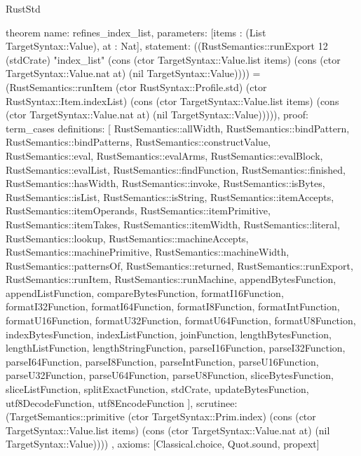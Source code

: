 \begin{lexlean}{RustStd}
\begin{semanticmodule}
theorem{
  name: refines_index_list,
  parameters: [items : (List TargetSyntax::Value), at : Nat],
  statement: ((RustSemantics::runExport 12 (stdCrate) "index_list" (cons (ctor TargetSyntax::Value.list items) (cons (ctor TargetSyntax::Value.nat at) (nil TargetSyntax::Value)))) = (RustSemantics::runItem (ctor RustSyntax::Profile.std) (ctor RustSyntax::Item.indexList) (cons (ctor TargetSyntax::Value.list items) (cons (ctor TargetSyntax::Value.nat at) (nil TargetSyntax::Value))))),
  proof: term_cases{
    definitions: [
      RustSemantics::allWidth,
      RustSemantics::bindPattern,
      RustSemantics::bindPatterns,
      RustSemantics::constructValue,
      RustSemantics::eval,
      RustSemantics::evalArms,
      RustSemantics::evalBlock,
      RustSemantics::evalList,
      RustSemantics::findFunction,
      RustSemantics::finished,
      RustSemantics::hasWidth,
      RustSemantics::invoke,
      RustSemantics::isBytes,
      RustSemantics::isList,
      RustSemantics::isString,
      RustSemantics::itemAccepts,
      RustSemantics::itemOperands,
      RustSemantics::itemPrimitive,
      RustSemantics::itemTakes,
      RustSemantics::itemWidth,
      RustSemantics::literal,
      RustSemantics::lookup,
      RustSemantics::machineAccepts,
      RustSemantics::machinePrimitive,
      RustSemantics::machineWidth,
      RustSemantics::patternsOf,
      RustSemantics::returned,
      RustSemantics::runExport,
      RustSemantics::runItem,
      RustSemantics::runMachine,
      appendBytesFunction,
      appendListFunction,
      compareBytesFunction,
      formatI16Function,
      formatI32Function,
      formatI64Function,
      formatI8Function,
      formatIntFunction,
      formatU16Function,
      formatU32Function,
      formatU64Function,
      formatU8Function,
      indexBytesFunction,
      indexListFunction,
      joinFunction,
      lengthBytesFunction,
      lengthListFunction,
      lengthStringFunction,
      parseI16Function,
      parseI32Function,
      parseI64Function,
      parseI8Function,
      parseIntFunction,
      parseU16Function,
      parseU32Function,
      parseU64Function,
      parseU8Function,
      sliceBytesFunction,
      sliceListFunction,
      splitExactFunction,
      stdCrate,
      updateBytesFunction,
      utf8DecodeFunction,
      utf8EncodeFunction
    ],
    scrutinee: (TargetSemantics::primitive (ctor TargetSyntax::Prim.index) (cons (ctor TargetSyntax::Value.list items) (cons (ctor TargetSyntax::Value.nat at) (nil TargetSyntax::Value))))
  },
  axioms: [Classical.choice, Quot.sound, propext]
}


\end{semanticmodule}
\end{lexlean}
